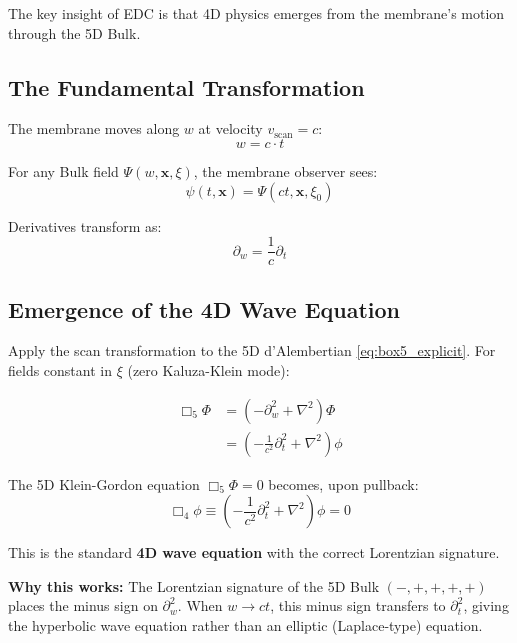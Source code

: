 The key insight of EDC is that 4D physics emerges from the membrane's motion through the 5D Bulk.

\subsection{The Fundamental Transformation}

The membrane moves along $w$ at velocity $v_{\text{scan}} = c$:
\begin{equation}
w = c \cdot t
\label{eq:scan_relation}
\end{equation}

For any Bulk field $\Psi(w, \mathbf{x}, \xi)$, the membrane observer sees:
\begin{equation}
\psi(t, \mathbf{x}) = \Psi(ct, \mathbf{x}, \xi_0)
\label{eq:pullback_field}
\end{equation}

Derivatives transform as:
\begin{equation}
\partial_w = \frac{1}{c}\partial_t
\label{eq:derivative_transform}
\end{equation}

\subsection{Emergence of the 4D Wave Equation}

Apply the scan transformation to the 5D d'Alembertian \eqref{eq:box5_explicit}. For fields constant in $\xi$ (zero Kaluza-Klein mode):

\begin{align}
\Box_5 \Phi &= \left(-\partial_w^2 + \nabla^2\right)\Phi \\
&= \left(-\frac{1}{c^2}\partial_t^2 + \nabla^2\right)\phi
\end{align}

\begin{tcolorbox}[colback=green!5,colframe=green!70,title=Key Derivation: 4D Wave Equation]
The 5D Klein-Gordon equation $\Box_5\Phi = 0$ becomes, upon pullback:
\begin{equation}
\boxed{\Box_4 \phi \equiv \left(-\frac{1}{c^2}\partial_t^2 + \nabla^2\right)\phi = 0}
\label{eq:wave_4d}
\end{equation}

This is the standard \textbf{4D wave equation} with the correct Lorentzian signature.
\end{tcolorbox}

\textbf{Why this works:} The Lorentzian signature of the 5D Bulk $(-,+,+,+,+)$ places the minus sign on $\partial_w^2$. When $w \to ct$, this minus sign transfers to $\partial_t^2$, giving the hyperbolic wave equation rather than an elliptic (Laplace-type) equation.

